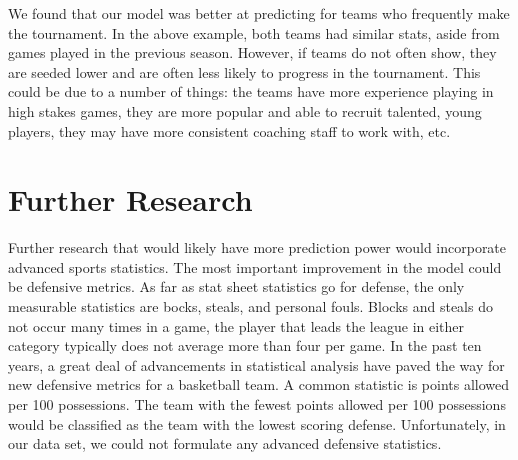 \documentclass[]{scrartcl}
\begin{document}
We found that our model was better at predicting for teams who frequently make the tournament. In the above example, both teams had similar stats, aside from games played in the previous season. However, if teams do not often show, they are seeded lower and are often less likely to progress in the tournament. This could be due to a number of things: the teams have more experience playing in high stakes games, they are more popular and able to recruit talented, young players, they may have more consistent coaching staff to work with, etc.

\section*{Further Research}
Further research that would likely have more prediction power would incorporate advanced sports statistics. The most important improvement in the model could be defensive metrics. As far as stat sheet statistics go for defense, the only measurable statistics are bocks, steals, and personal fouls. Blocks and steals do not occur many times in a game, the  player that leads the league in either category typically does not average more than four per game. In the past ten years, a great deal of advancements in statistical analysis have paved the way for new defensive metrics for a basketball team. A common statistic is points allowed per 100 possessions. The team with the fewest points allowed per 100 possessions would be classified as the team with the lowest scoring defense. Unfortunately, in our data set, we could not formulate any advanced defensive statistics.
\end{document}
